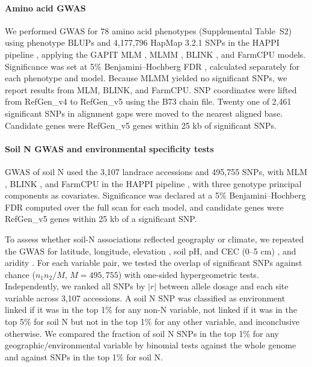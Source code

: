 \documentclass[11pt]{article}
\begin{document}
\paragraph*{Amino acid GWAS}
We performed GWAS for 78 amino acid phenotypes (Supplemental Table~S2) using phenotype BLUPs and 4,177,796 HapMap 3.2.1 SNPs in the HAPPI pipeline \citep{Slaten2020HAPPI}, applying the GAPIT \citep{Wang2021GAPIT3} MLM \citep{Yu2006MLM}, MLMM \citep{Segura2012MLMM}, BLINK \citep{Huang2019BLINK}, and FarmCPU \citep{Liu2016FarmCPU} models. Significance was set at 5\% Benjamini--Hochberg FDR \citep{Benjamini1995FDR}, calculated separately for each phenotype and model. Because MLMM yielded no significant SNPs, we report results from MLM, BLINK, and FarmCPU. SNP coordinates were lifted from RefGen\_v4 to RefGen\_v5 using the B73 chain file. Twenty one of 2,461 significant SNPs in alignment gaps were moved to the nearest aligned base. Candidate genes were RefGen\_v5 genes within 25 kb of significant SNPs.

\paragraph*{Soil N GWAS and environmental specificity tests}
GWAS of soil N used the 3,107 landrace accessions and 495,755 SNPs, with MLM \citep{Yu2006MLM}, BLINK \citep{Huang2019BLINK}, and FarmCPU \citep{Liu2016FarmCPU} in the HAPPI pipeline \citep{Slaten2020HAPPI}, with three genotype principal components as covariates. Significance was declared at a 5\% Benjamini--Hochberg FDR computed over the full scan for each model, and candidate genes were RefGen\_v5 genes within 25 kb of a significant SNP.

To assess whether soil-N associations reflected geography or climate, we repeated the GWAS for latitude, longitude, elevation \citep{RomeroNavarro2017Landraces}, soil pH, and CEC (0--5 cm) \citep{Poggio2021SoilGrids}, and aridity \citep{Zomer2022Aridity}. For each variable pair, we tested the overlap of significant SNPs against chance ($n_1 n_2 / M$, $M = 495{,}755$) with one-sided hypergeometric tests. Independently, we ranked all SNPs by $|r|$ between allele dosage and each site variable across 3,107 accessions. A soil N SNP was classified as environment linked if it was in the top 1\% for any non-N variable, not linked if it was in the top 5\% for soil N but not in the top 1\% for any other variable, and inconclusive otherwise. We compared the fraction of soil N SNPs in the top 1\% for any geographic/environmental variable by binomial tests against the whole genome and against SNPs in the top 1\% for soil N.
\end{document}
